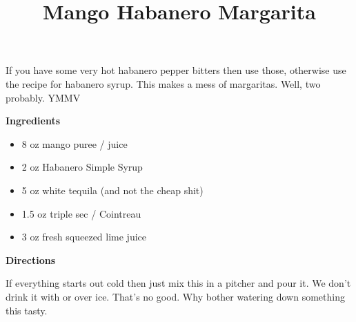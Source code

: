\documentclass{article}
\title{Mango Habanero Margarita}
\begin{document}
If you have some very hot habanero pepper bitters then use those, otherwise use the
recipe for habanero syrup. This makes a mess of margaritas. Well, two probably. YMMV

\bigskip

\bigskip

\textbf{Ingredients}

\begin{itemize}
      \item 8 oz mango puree / juice
      \item 2 oz Habanero Simple Syrup
      \item 5 oz white tequila (and not the cheap shit)
      \item 1.5 oz triple sec / Cointreau
      \item 3 oz fresh squeezed lime juice
\end{itemize}

\bigskip

\textbf{Directions}


If everything starts out cold then just mix this in a pitcher and pour it. We don't drink
it with or over ice. That's no good. Why bother watering down something this tasty.

\end{document}
